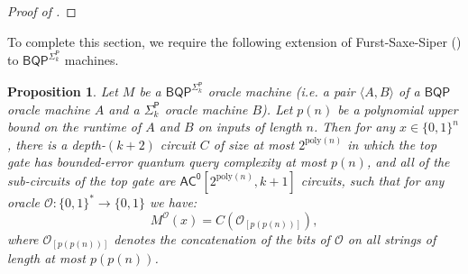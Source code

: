 \documentclass[11pt]{article}%
\newtheorem{proposition}[theorem]{Proposition}
\newcommand{\poly}{\mathrm{poly}}
\newcommand{\Sipser}{\normalfont\textsc{Sipser}}
\begin{document}
\begin{proof}[Proof of ]
%
\end{proof}

To complete this section, we require the following extension of Furst-Saxe-Siper \cite{FSS84} () to $\mathsf{BQP}^{\mathsf{\Sigma}_k^\mathsf{P}}$ machines.

\begin{proposition}
\label{prop:fss_bqp^ph}
Let $M$ be a $\mathsf{BQP}^{\mathsf{\Sigma}_k^\mathsf{P}}$ oracle machine (i.e. a pair $\langle A, B \rangle$ of a $\mathsf{BQP}$ oracle machine $A$ and a $\mathsf{\Sigma}_k^\mathsf{P}$ oracle machine $B$). Let $p(n)$ be a polynomial upper bound on the runtime of $A$ and $B$ on inputs of length $n$. Then for any $x \in \{0,1\}^n$, there is a depth-$(k+2)$ circuit $C$ of size at most $2^{\poly(n)}$ in which the top gate has bounded-error quantum query complexity at most $p(n)$, and all of the sub-circuits of the top gate are $\mathsf{AC^0}\left[2^{\poly(n)}, k+1\right]$ circuits, such that for any oracle $\mathcal{O}: \{0,1\}^* \to \{0,1\}$ we have:
\[
M^\mathcal{O}(x) = C\left( \mathcal{O}_{[p(p(n))]} \right),
\]
where $\mathcal{O}_{[p(p(n))]}$ denotes the concatenation of the bits of $\mathcal{O}$ on all strings of length at most $p(p(n))$.
\end{proposition}
\end{document}
